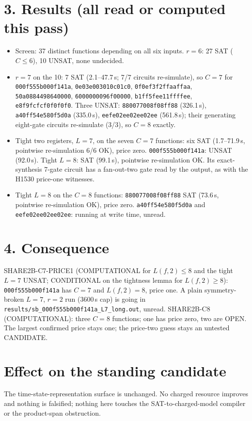 \documentclass[11pt]{article}
\begin{document}
\section*{3. Results (all read or computed this pass)}
\begin{itemize}
\item Screen: 37 distinct functions depending on all six inputs. $r=6$: 27 SAT ($C\le6$), 10 UNSAT, none undecided.
\item $r=7$ on the 10: 7 SAT (2.1--47.7\,s; 7/7 circuits re-simulate), so $C=7$ for \texttt{000f555b000f141a}, \texttt{0e03e003010c01c0}, \texttt{0f0ef3f2ffaaffaa}, \texttt{50a0884498640000}, \texttt{6000000096f00000}, \texttt{b1ff5fee11ffffee}, \texttt{e8f9fcfcf0f0f0f0}. Three UNSAT: \texttt{880077008f08ff88} (326.1\,s), \texttt{a40ff54e580f5d0a} (335.0\,s), \texttt{eefe02ee02ee02ee} (561.8\,s); their generating eight-gate circuits re-simulate (3/3), so $C=8$ exactly.
\item Tight two registers, $L=7$, on the seven $C=7$ functions: six SAT (1.7--71.9\,s, pointwise re-simulation 6/6 OK), price zero. \texttt{000f555b000f141a}: UNSAT (92.0\,s). Tight $L=8$: SAT (99.1\,s), pointwise re-simulation OK. Its exact-synthesis 7-gate circuit has a fan-out-two gate read by the output, as with the H1530 price-one witnesses.
\item Tight $L=8$ on the $C=8$ functions: \texttt{880077008f08ff88} SAT (73.6\,s, pointwise re-simulation OK), price zero. \texttt{a40ff54e580f5d0a} and \texttt{eefe02ee02ee02ee}: running at write time, unread.
\end{itemize}

\section*{4. Consequence}
SHARE2B-C7-PRICE1 (COMPUTATIONAL for $L(f,2)\le8$ and the tight $L=7$ UNSAT; CONDITIONAL on the tightness lemma for $L(f,2)\ge8$): \texttt{000f555b000f141a} has $C=7$ and $L(f,2)=8$, price one. A plain symmetry-broken $L=7$, $r=2$ run (3600\,s cap) is going in \texttt{results/sb\_000f555b000f141a\_L7\_long.out}, unread. SHARE2B-C8 (COMPUTATIONAL): three $C=8$ functions; one has price zero, two are OPEN. The largest confirmed price stays one; the price-two guess stays an untested CANDIDATE.

\section*{Effect on the standing candidate}
The time-state-representation surface is unchanged. No charged resource improves and nothing is falsified; nothing here touches the SAT-to-charged-model compiler or the product-span obstruction.
\end{document}
